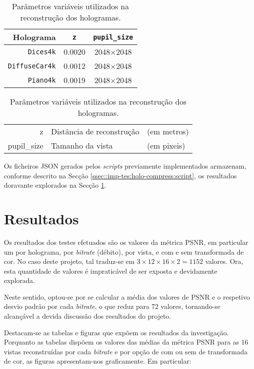 \begin{table}[!htbp]
    \centering
    \caption{Parâmetros variáveis utilizados na reconstrução dos hologramas.}
    \label{tab:teste-parametros}
    \begin{tabular}{r c c}
        \toprule
        Holograma & \verb|z| & \verb|pupil_size| \\
        \midrule
        \texttt{Dices4k} & \SI{0.0020}{} & 2048$\times$2048 \\
        \texttt{DiffuseCar4k} & \SI{0.0012}{} & 2048$\times$2048 \\
        \texttt{Piano4k} & \SI{0.0019}{} & 2048$\times$2048 \\
        \bottomrule
    \end{tabular}
    \subcaption*{}
    \begin{tabular}{>{\ttfamily}r @{~:~~} l l}
        z & Distância de reconstrução & (em metros) \\
        pupil\_size & Tamanho da vista & (em pixeis) \\
    \end{tabular}
\end{table}

Os ficheiros \ac{JSON} gerados pelos \textit{scripts} previamente implementados armazenam, conforme descrito na Secção \ref{ssec::imp-tes:holo-compress:script}, os resultados doravante explorados na Secção \ref{sec::test-result:result}.


\section{Resultados}
\label{sec::test-result:result}

Os resultados dos testes efetuados são os valores da métrica \ac{PSNR}, em particular um por holograma, por \textit{bitrate} (débito), por vista, e com e sem transformada de cor. No caso deste projeto, tal traduz-se em $3 \times 12 \times 16 \times 2 = 1152$ valores. Ora, esta quantidade de valores é impraticável de ser exposta e devidamente explorada.

Neste sentido, optou-se por se calcular a média dos valores de \ac{PSNR} e o respetivo desvio padrão por cada \textit{bitrate}, o que reduz para $72$ valores, tornando-se alcançável a devida discussão dos resultados do projeto.

Destacam-se as tabelas e figuras que expõem os resultados da investigação. Porquanto as tabelas dispõem os valores das médias da métrica \ac{PSNR} para as 16 vistas reconstruídas por cada \textit{bitrate} e por opção de com ou sem de transformada de cor, as figuras apresentam-nos graficamente. Em particular:

